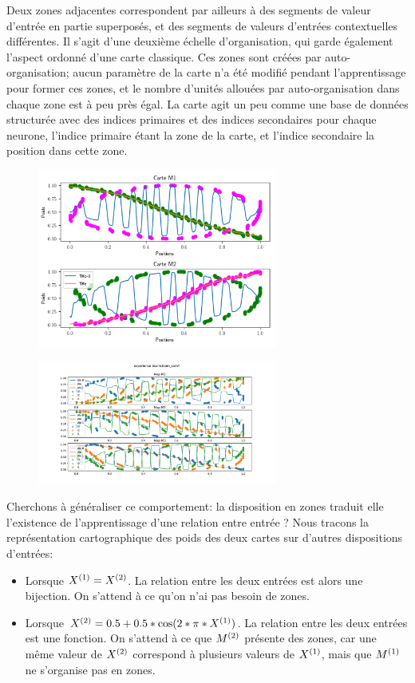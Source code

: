 Deux zones adjacentes correspondent par ailleurs à des segments de valeur d'entrée en partie superposés, et des segments de valeurs d'entrées contextuelles différentes. Il s'agit d'une deuxième échelle d'organisation, qui garde également l'aspect ordonné d'une carte classique. Ces zones sont créées par auto-organisation; aucun paramètre de la carte n'a été modifié pendant l'apprentissage pour former ces zones, et le nombre d'unités allouées par auto-organisation dans chaque zone est à peu près égal. La carte agit un peu comme une base de données structurée avec des indices primaires et des indices secondaires pour chaque neurone, l'indice primaire étant la zone de la carte, et l'indice secondaire la position dans cette zone.

\begin{figure}
	\includegraphics[width=0.7\textwidth]{2som_cercle_w.pdf}
\end{figure}

\begin{figure}
	\includegraphics[width=0.7\textwidth]{3som_cercle_w.pdf}
\end{figure}

Cherchons à généraliser ce comportement: la disposition en zones traduit elle l'existence de l'apprentissage d'une relation entre entrée ?
Nous tracons la représentation cartographique des poids des deux cartes sur d'autres dispositions d'entrées: 
\begin{itemize}
	\item Lorsque $X^{({1})} = X^{({2})}$. La relation entre les deux entrées est alors une bijection. On s'attend à ce qu'on n'ai pas besoin de zones.
	\item Lorsque $X^{({2})} = 0.5+0.5*\cos(2*\pi*X^{({1})})$. La relation entre les deux entrées est une fonction. On s'attend à ce que $M^{({2})}$ présente des zones, car une même valeur de $X^{({2})}$ correspond à plusieurs valeurs de $X^{({1})}$, mais que $M^{({1})}$ ne s'organise pas en zones.
\end{itemize}


